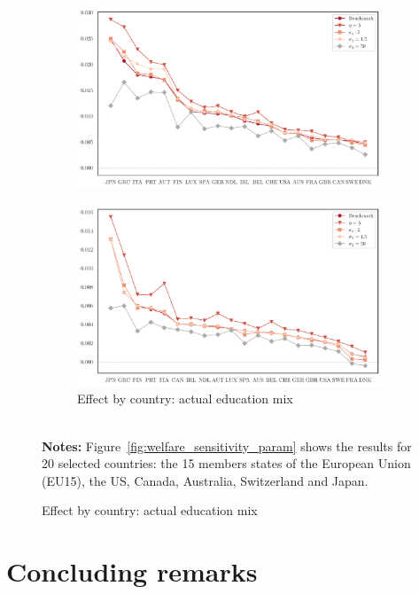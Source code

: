\documentclass[a4paper,12pt]{article}
\begin{document}
{\begin{landscape}
\begin{center}
\begin{figure}[htb!]
\begin{subfigure}{.45\linewidth}
  \includegraphics[width=\linewidth]{graphs/sens_Welf_HS.pdf}
\end{subfigure}%
\hfill
\begin{subfigure}{.45\linewidth}
  \centering
        \caption{Effect by country: actual education mix}
  \includegraphics[width=\linewidth]{graphs/sens_Welf_LS+HS.pdf}
\end{subfigure}
\\[0.5cm]
{\footnotesize \textbf{Notes:} Figure~\ref{fig:welfare_sensitivity_param} shows the results for 20 selected countries:
the 15 members states of the European Union (EU15), the US, Canada,
Australia, Switzerland and Japan.}
\end{figure}
\end{center}
\end{landscape}
\restoregeometry }

\section{Concluding remarks} \label{conclusion}
\end{document}
